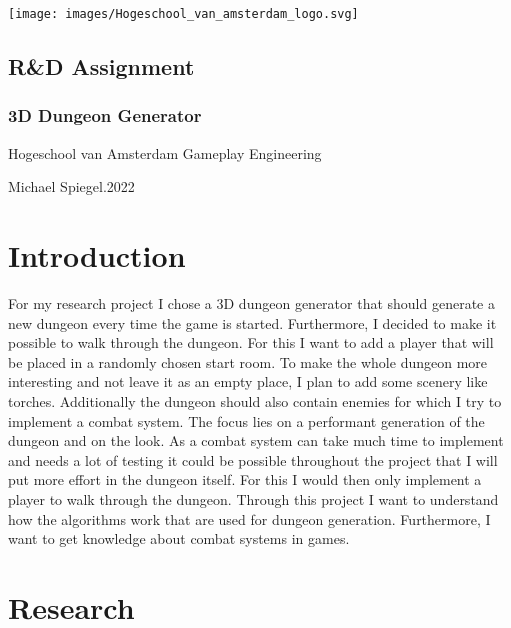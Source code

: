 \documentclass[a4paper,12pt,oneside]{scrreprt}
\begin{document}
\thispagestyle{empty}
\begin{titlepage}
  \begin{flushright}
  \texttt{[image: images/Hogeschool\_van\_amsterdam\_logo.svg]}
  \end{flushright}
  \begin{flushleft}
  \section*{R\&D Assignment}
  \subsection*{3D Dungeon Generator}

  \vspace{1cm}
  Hogeschool van Amsterdam\newline
  Gameplay Engineering

  \vspace{0.5cm}

  Michael Spiegel.2022
  \end{flushleft}
\end{titlepage}

\tableofcontents

\chapter{Introduction}
For my research project I chose a 3D dungeon generator that should generate a new dungeon every time the game is started. Furthermore, I decided to make it possible to walk through the dungeon. For this I want to add a player that will be placed in a randomly chosen start room. To make the whole dungeon more interesting and not leave it as an empty place, I plan to add some scenery like torches. Additionally the dungeon should also contain enemies for which I try to implement a combat system. The focus lies on a performant generation of the dungeon and on the look. As a combat system can take much time to implement and needs a lot of testing it could be possible throughout the project that I will put more effort in the dungeon itself. For this I would then only implement a player to walk through the dungeon. Through this project I want to understand how the algorithms work that are used for dungeon generation. Furthermore, I want to get knowledge about combat systems in games.

\chapter{Research}
\end{document}
